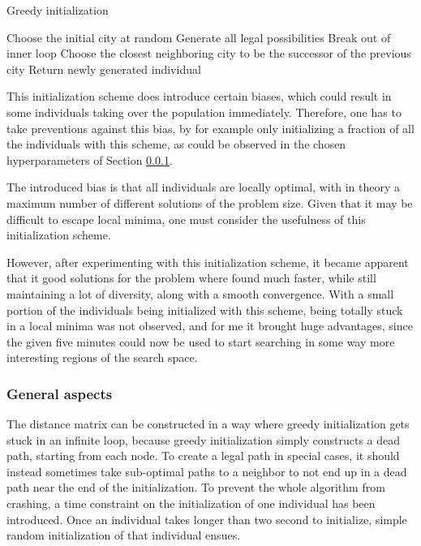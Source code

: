 \documentclass[a4paper,10pt]{article}
\begin{document}
\begin{algorithm}
\caption{Greedy initialization}\label{greedy_initialization_algorithm}
\begin{algorithmic}
\State Choose the initial city at random
\State Generate all legal possibilities
\State Break out of inner loop
\EndIf
\State Choose the closest neighboring city to be the successor of the previous city
\EndWhile
{}
\State Return newly generated individual
\EndIf
\EndWhile
\end{algorithmic}
\end{algorithm}

This initialization scheme does introduce certain biases, which could result in some individuals taking over the population immediately. Therefore, one has to take preventions against this bias, by for example only initializing a fraction of all the individuals with this scheme, as could be observed in the chosen hyperparameters of Section \ref{general_aspects_initialization}.

The introduced bias is that all individuals are locally optimal, with in theory a maximum number of different solutions of the problem size. Given that it may be difficult to escape local minima, one must consider the usefulness of this initialization scheme.

However, after experimenting with this initialization scheme, it became apparent that it good solutions for the problem where found much faster, while still maintaining a lot of diversity, along with a smooth convergence. With a small portion of the individuals being initialized with this scheme, being totally stuck in a local minima was not observed, and for me it brought huge advantages, since the given five minutes could now be used to start searching in some way more interesting regions of the search space.

\subsubsection{General aspects}
\label{general_aspects_initialization}
The distance matrix can be constructed in a way where greedy initialization gets stuck in an infinite loop, because greedy initialization simply constructs a dead path, starting from each node. To create a legal path in special cases, it should instead sometimes take sub-optimal paths to a neighbor to not end up in a dead path near the end of the initialization. To prevent the whole algorithm from crashing, a time constraint on the initialization of one individual has been introduced. Once an individual takes longer than two second to initialize, simple random initialization of that individual ensues.
\end{document}
